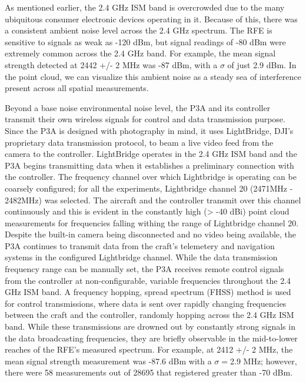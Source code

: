 \documentclass[pageno]{jpaper}
\begin{document}
As mentioned earlier, the 2.4 GHz ISM band is overcrowded due to the many ubiquitous consumer electronic devices operating in it. Because of this, there was a consistent ambient noise level across the 2.4 GHz spectrum. The RFE is sensitive to signals as weak as -120 dBm, but signal readings of -80 dBm were extremely common across the 2.4 GHz band. For example, the mean signal strength detected at 2442 +/- 2 MHz was -87 dBm, with a $\sigma$ of just 2.9 dBm. In the point cloud, we can visualize this ambient noise as a steady sea of interference present across all spatial measurements.

Beyond a base noise environmental noise level, the P3A and its controller transmit their own wireless signals for control and data transmission purpose. Since the P3A is designed with photography in mind, it uses LightBridge, DJI's proprietary data transmission protocol, to beam a live video feed from the camera to the controller. LightBridge operates in the 2.4 GHz ISM band and the P3A begins transmitting data when it establishes a preliminary connection with the controller. The frequency channel over which Lightbridge is operating can be coarsely configured; for all the experiments, Lightbridge channel 20 (2471MHz - 2482MHz) was selected. The aircraft and the controller transmit over this channel continuously and this is evident in the constantly high (> -40 dBi) point cloud measurements for frequencies falling withing the range of Lightbridge channel 20. Despite the built-in camera being disconnected and no video being available, the P3A continues to transmit data from the craft's telemetery and navigation systems in the configured Lightbridge channel. While the data transmission frequency range can be manually set, the P3A receives remote control signals from the controller at non-configurable, variable frequencies throughout the 2.4 GHz ISM band. A frequency hopping, spread spectrum (FHSS) method is used for control transmissions, where data is sent over rapidly changing frequencies between the craft and the controller, randomly hopping across the 2.4 GHz ISM band. While these transmissions are drowned out by constantly strong signals in the data broadcasting frequencies, they are briefly observable in the mid-to-lower reaches of the RFE's measured spectrum. For example, at 2412 +/- 2 MHz, the mean signal strength measurement was -87.6 dBm with a $\sigma =$2.9 MHz; however, there were 58 measurements out of 28695 that registered greater than -70 dBm. 
\end{document}
